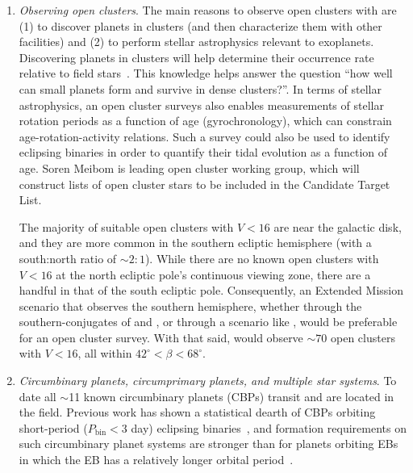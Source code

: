 \begin{enumerate}
	\item \textit{Observing open clusters}.
	The main reasons to observe open clusters with \tess are (1) to discover planets in clusters (and then characterize them with other facilities) and (2) to perform stellar astrophysics relevant to exoplanets.
	Discovering planets in clusters will help determine their occurrence rate relative to field stars~\citep{meibom_same_2013}.
	This knowledge helps answer the question ``how well can small planets form and survive in dense clusters?''. 
	In terms of stellar astrophysics, an open cluster surveys also enables measurements of stellar rotation periods as a function of age (gyrochronology), which can constrain age-rotation-activity relations.
	Such a survey could also be used to identify eclipsing binaries in order to quantify their tidal evolution as a function of age.
	Soren Meibom is leading \tesss open cluster working group, which will construct lists of open cluster stars to be included in the \tess Candidate Target List.
	
	The majority of suitable open clusters with $V<16$ are near the galactic disk, and they are more common in the southern ecliptic hemisphere (with a south:north ratio of $\sim\!2:1$).
	While there are no known open clusters with $V<16$ at the north ecliptic pole's continuous viewing zone, there are a handful in that of the south ecliptic pole.
	Consequently, an Extended Mission scenario that observes the southern hemisphere, whether through the southern-conjugates of \npole\:and \npole, or through a scenario like \shemiAvoid, would be preferable for an open cluster survey.
	With that said, \npole\:would observe $\sim70$ open clusters with $V<16$, all within $42^\circ<\beta<68^\circ$.
	
	\item \textit{Circumbinary planets, circumprimary planets, and multiple star systems}.
	To date all $\sim$11 known circumbinary planets (CBPs) transit and are located in the \kepler field.
	Previous work has shown a statistical dearth of CBPs orbiting short-period ($P_\mathrm{bin} < 3$ day) eclipsing binaries~\citep{armstrong_abundance_2014,martin_planets_2014}, and formation requirements on such circumbinary planet systems are stronger than for planets orbiting EBs in which the EB has a relatively longer orbital period~\citep{martin_no_2015}.
	

\end{enumerate}
